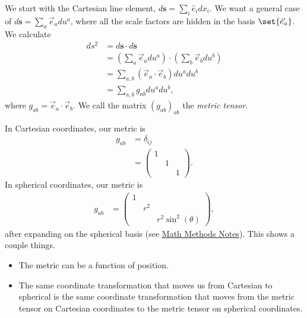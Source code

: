 \documentclass[10pt]{mypackage}
\begin{document}
  We start with the Cartesian line element, $d\mathbf{s} = \sum_{i}\hat{e}_idx_i$. We want a general case of $d\mathbf{s} = \sum_{a}\vec{e}_a du^{a}$, where all the scale factors are hidden in the basis $\set{\vec{e}_a}$. We calculate
  \begin{align*}
    ds^2 &= d\mathbf{s}\cdot d\mathbf{s}\\
         &= \left( \sum_{a}\vec{e}_adu^a \right)\cdot \left( \sum_{b}\vec{e}_bdu^b \right)\\
         &= \sum_{a,b}\left( \vec{e}_a\cdot \vec{e}_b \right)du^adu^b\\
         &= \sum_{a,b}g_{ab}du^adu^b,
  \end{align*}
  where $g_{ab} = \vec{e}_a\cdot \vec{e}_b$. We call the matrix $\left( g_{ab} \right)_{ab}$ the \textit{metric tensor}.
  \begin{example}
    In Cartesian coordinates, our metric is
    \begin{align*}
      g_{ab} &= \delta_{ij}\\
             &= \begin{pmatrix}1 & & \\ & 1 & \\ & & 1\end{pmatrix}.
    \end{align*}
    In spherical coordinates, our metric is
    \begin{align*}
      g_{ab} &= \begin{pmatrix}1 & & \\ & r^2 & \\ & & r^2\sin^2\left( \theta \right)\end{pmatrix},
    \end{align*}
    after expanding on the spherical basis (see \href{https://ai.avinash-iyer.com/Classes_and_Homework/College/Y4/Y4S1,%20Math%20Methods/math_methods_notes.pdf}{Math Methods Notes}). This shows a couple things.
      \begin{itemize}
        \item The metric can be a function of position.
        \item The same coordinate transformation that moves us from Cartesian to spherical is the same coordinate transformation that moves from the metric tensor on Cartesian coordinates to the metric tensor on spherical coordinates.
      \end{itemize}
  \end{example}
\end{document}
